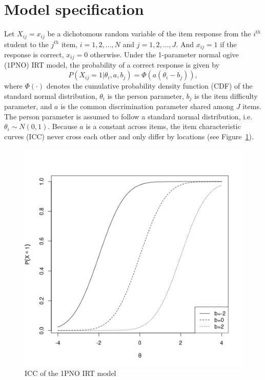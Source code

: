 \documentclass[floatsintext, man]{apa7}
\begin{document}
\section{Model specification} 
Let $X_{ij} = x_{ij}$ be a dichotomous random variable of the item response from
the $i^{th}$ student to the $j^{th}$ item, $i = 1, 2, \dots, N$ and $j = 1, 2,
\dots, J$. And $x_{ij} = 1$ if the response is correct, $x_{ij} = 0$ otherwise.
Under the 1-parameter normal ogive (1PNO) IRT model, the probability of a
correct response is given by 
\begin{equation}
\label{eq:1PNO_with_a}
  P(X_{ij} = 1 | \theta_i, a, b_j) = \Phi(a(\theta_i - b_j)),
\end{equation}
where $\Phi(\cdot)$ denotes the cumulative probability density function (CDF) of
the standard normal distribution, $\theta_i$ is the person parameter, $b_j$ is
the item difficulty parameter, and $a$ is the common discrimination parameter
shared among $J$ items. The person parameter is assumed to follow a standard
normal distribution, i.e. $\theta_i \sim N(0,1)$. Because $a$ is a constant
across items, the item characteristic curves (ICC) never cross each other and
only differ by locations (see Figure~\ref{fig:ICC}).
\begin{figure}[t]
\centering
  \includegraphics[scale=0.5]{Fig/ICC.png}
  \caption{ICC of the 1PNO IRT model}
  \label{fig:ICC}
\end{figure}
\end{document}
